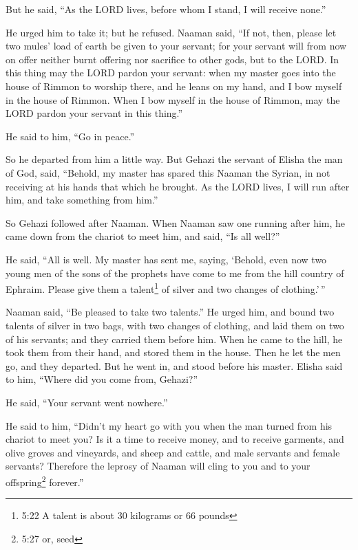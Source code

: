  But he said, ``As the LORD lives, before whom I stand, I
will receive none.''

He urged him to take it; but he refused.  Naaman said, ``If
not, then, please let two mules' load of earth be given to your servant;
for your servant will from now on offer neither burnt offering nor
sacrifice to other gods, but to the LORD.  In this thing
may the LORD pardon your servant: when my master goes into the house of
Rimmon to worship there, and he leans on my hand, and I bow myself in
the house of Rimmon. When I bow myself in the house of Rimmon, may the
LORD pardon your servant in this thing.''

 He said to him, ``Go in peace.''

So he departed from him a little way.  But Gehazi the
servant of Elisha the man of God, said, ``Behold, my master has spared
this Naaman the Syrian, in not receiving at his hands that which he
brought. As the LORD lives, I will run after him, and take something
from him.''

 So Gehazi followed after Naaman. When Naaman saw one
running after him, he came down from the chariot to meet him, and said,
``Is all well?''

 He said, ``All is well. My master has sent me, saying,
`Behold, even now two young men of the sons of the prophets have come to
me from the hill country of Ephraim. Please give them a
talent\footnote{5:22 A talent is about 30 kilograms or 66 pounds} of
silver and two changes of clothing.'\,''

 Naaman said, ``Be pleased to take two talents.'' He urged
him, and bound two talents of silver in two bags, with two changes of
clothing, and laid them on two of his servants; and they carried them
before him.  When he came to the hill, he took them from
their hand, and stored them in the house. Then he let the men go, and
they departed.  But he went in, and stood before his
master. Elisha said to him, ``Where did you come from, Gehazi?''

He said, ``Your servant went nowhere.''

 He said to him, ``Didn't my heart go with you when the man
turned from his chariot to meet you? Is it a time to receive money, and
to receive garments, and olive groves and vineyards, and sheep and
cattle, and male servants and female servants?  Therefore
the leprosy of Naaman will cling to you and to your offspring\footnote{5:27
  or, seed} forever.''

